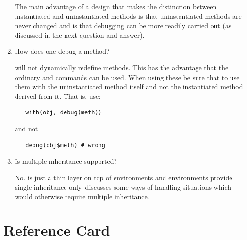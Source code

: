 \documentclass{Z}
\begin{document}
\begin{appendix}
\begin{enumerate}
{The main advantage of a design that makes the distinction between instantiated 
and uninstantiated methods is that uninstantiated methods are never
changed and is that 
debugging can be more readily carried out (as discussed in the next
question and answer).
}
\item{How does one debug a method?

 will not dynamically redefine methods.  This has the advantage
that the ordinary   and  commands can be 
used.  When using these be sure that to use them with the uninstantiated method
itself and not the instantiated method derived from it.  That is,
use:
\begin{verbatim}
   with(obj, debug(meth))
\end{verbatim}

and not 
\begin{verbatim}
   debug(obj$meth) # wrong
\end{verbatim}
}
\item{Is multiple inheritance supported?  

No.  is just a thin layer on top of  
environments and  environments
provide single inheritance only.  \citep{Kates2004}
discusses some ways of handling situations which would otherwise require
multiple inheritance.}
\end{enumerate}
\newpage{}
\section{Reference Card}
\label{sec:ref}

\end{appendix}
\end{document}
